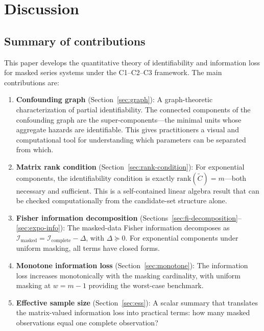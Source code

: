 \documentclass[11pt]{article}
\theoremstyle{definition}
\theoremstyle{plain}
\newcommand{\rank}{\mathrm{rank}}
\newcommand{\FI}{\mathcal{I}}       %
\newcommand{\Ctilde}{\tilde{C}}
\begin{document}
\section{Discussion}
\label{sec:discussion}

\subsection{Summary of contributions}

This paper develops the quantitative theory of identifiability and
information loss for masked series systems under the C1--C2--C3
framework.
The main contributions are:

\begin{enumerate}
    \item \textbf{Confounding graph}
    (Section~\ref{sec:graph}): A graph-theoretic characterization of
    partial identifiability.
    The connected components of the confounding graph are the
    super-components---the minimal units whose aggregate hazards are
    identifiable.
    This gives practitioners a visual and computational tool for
    understanding which parameters can be separated from which.

    \item \textbf{Matrix rank condition}
    (Section~\ref{sec:rank-condition}): For exponential components,
    the identifiability condition is exactly
    $\rank(\Ctilde) = m$---both necessary and sufficient.
    This is a self-contained linear algebra result that can be checked
    computationally from the candidate-set structure alone.

    \item \textbf{Fisher information decomposition}
    (Sections~\ref{sec:fi-decomposition}--\ref{sec:expo-info}):
    The masked-data Fisher information decomposes as
    $\FI_{\mathrm{masked}} = \FI_{\mathrm{complete}} - \Delta$,
    with $\Delta \succeq 0$.
    For exponential components under uniform masking, all terms
    have closed forms.

    \item \textbf{Monotone information loss}
    (Section~\ref{sec:monotone}): The information loss increases
    monotonically with the masking cardinality, with uniform masking
    at $w = m - 1$ providing the worst-case benchmark.

    \item \textbf{Effective sample size}
    (Section~\ref{sec:ess}): A scalar summary that translates the
    matrix-valued information loss into practical terms: how many
    masked observations equal one complete observation?


\end{enumerate}
\end{document}
